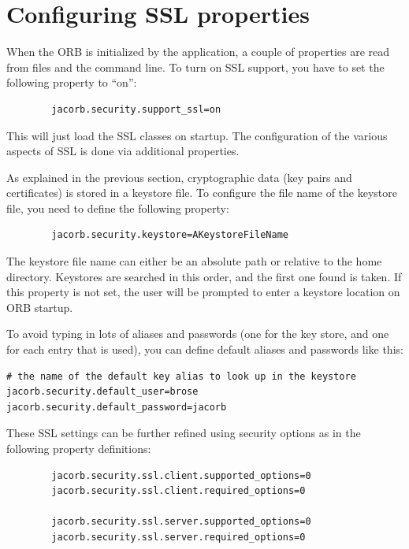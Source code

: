 \section{Configuring SSL properties}

When the ORB is initialized by the application, a couple of properties
are read from files and the  command line. To turn on SSL support, you have to
set the following property to ``on'':

\begin{verbatim}
        jacorb.security.support_ssl=on
\end{verbatim}

This will just load the SSL classes on startup. The configuration of the
various aspects of SSL is done via additional properties.

As explained  in the previous  section, cryptographic data  (key pairs
and  certificates) is  stored in  a  keystore  file. To configure the
file name of the keystore file, you need to define the following
property:

\begin{verbatim}
        jacorb.security.keystore=AKeystoreFileName
\end{verbatim}

The keystore file name can either be an absolute path or relative to
the home directory. Keystores are searched in this order, and the
first one found is taken. If this property is not set, the user will be
prompted to enter a keystore location on ORB startup.

To avoid  typing in  lots of  aliases and passwords  (one for  the key
store, and  one for each entry  that is used), you  can define default
aliases and passwords like this:

\begin{verbatim}
# the name of the default key alias to look up in the keystore
jacorb.security.default_user=brose
jacorb.security.default_password=jacorb
\end{verbatim}


These SSL settings can be further refined using security options as in
the following property definitions:

\begin{verbatim}
        jacorb.security.ssl.client.supported_options=0
        jacorb.security.ssl.client.required_options=0

        jacorb.security.ssl.server.supported_options=0
        jacorb.security.ssl.server.required_options=0
\end{verbatim}

